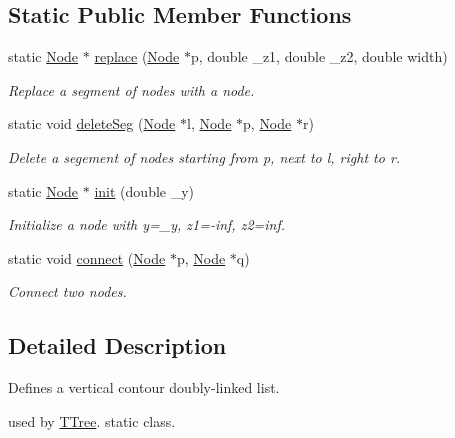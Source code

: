 \subsection*{Static Public Member Functions}
\begin{DoxyCompactItemize}
\item 
static \hyperlink{structContourList_1_1Node}{Node} $\ast$ \hyperlink{classContourList_a22e4108f67b534548a608b43b6de5d2d}{replace} (\hyperlink{structContourList_1_1Node}{Node} $\ast$p, double \+\_\+z1, double \+\_\+z2, double width)
\begin{DoxyCompactList}\small\item\em Replace a segment of nodes with a node. \end{DoxyCompactList}\item 
static void \hyperlink{classContourList_add57efb2cdaba0626be3138c91f5d43a}{delete\+Seg} (\hyperlink{structContourList_1_1Node}{Node} $\ast$l, \hyperlink{structContourList_1_1Node}{Node} $\ast$p, \hyperlink{structContourList_1_1Node}{Node} $\ast$r)
\begin{DoxyCompactList}\small\item\em Delete a segement of nodes starting from p, next to l, right to r. \end{DoxyCompactList}\item 
static \hyperlink{structContourList_1_1Node}{Node} $\ast$ \hyperlink{classContourList_a4a9caa54290e0ca516375429a52cf768}{init} (double \+\_\+y)
\begin{DoxyCompactList}\small\item\em Initialize a node with y=\+\_\+y, z1=-\/inf, z2=inf. \end{DoxyCompactList}\item 
static void \hyperlink{classContourList_a8aecef9a5d7ebe21b57b0e2af079fec4}{connect} (\hyperlink{structContourList_1_1Node}{Node} $\ast$p, \hyperlink{structContourList_1_1Node}{Node} $\ast$q)
\begin{DoxyCompactList}\small\item\em Connect two nodes. \end{DoxyCompactList}\end{DoxyCompactItemize}


\subsection{Detailed Description}
Defines a vertical contour doubly-\/linked list. 

used by \hyperlink{classTTree}{T\+Tree}. static class. 

